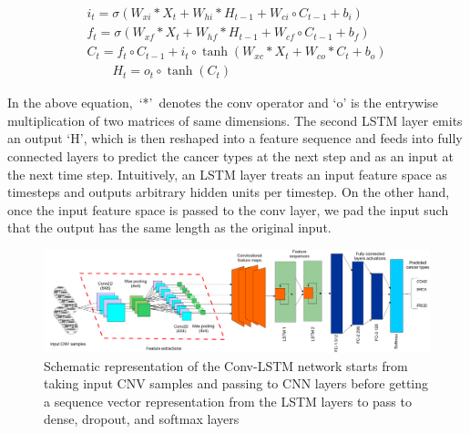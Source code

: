 \vspace{-4mm}
\begin{equation}
    \begin{array}{c}
            {i_{t}=\sigma\left(W_{x i} * {X}_{t}+W_{h i} * {H}_{t-1}+W_{c i} \circ {C}_{t-1}+b_{i}\right)} \\
            {f_{t}=\sigma\left(W_{x f} * {X}_{t}+W_{h f} * {H}_{t-1}+W_{c f} \circ {C}_{t-1}+b_{f}\right)} \\
            {{C}_{t}=f_{t} \circ {C}_{t-1}+i_{t} \circ \tanh \left(W_{x c} * {X}_{t}+W_{c o} * {C}_{t}+b_{o}\right)} \\
            {\qquad {H}_{t}=o_{t} \circ \tanh \left({C}_{t}\right)}
    \end{array}
\end{equation}
\vspace{-4mm}

\hspace*{3.5mm} In the above equation,~`*'~denotes the conv operator and `o' is the entrywise multiplication of two matrices of same dimensions. The second LSTM layer emits an output `H', which is then reshaped into a feature sequence and feeds into fully connected layers to predict the cancer types at the next step and as an input at the next time step. Intuitively, an LSTM layer treats an input feature space as timesteps and outputs arbitrary hidden units per timestep. On the other hand, once the input feature space is passed to the conv layer, we pad the input such that the output has the same length as the original input. 

\begin{figure}
	\centering
	\includegraphics[scale=0.5]{images/conv_lstm.png} 
	\caption[Schematic representation of the convolutional-LSTM network]{Schematic representation of the Conv-LSTM network starts from taking input CNV samples and passing to CNN layers before getting a sequence vector representation from the LSTM layers to pass to dense, dropout, and softmax layers~\cite{karimACCA2019}}	
	\label{fig:conv_lstm}
	\vspace{-2mm}
\end{figure}

